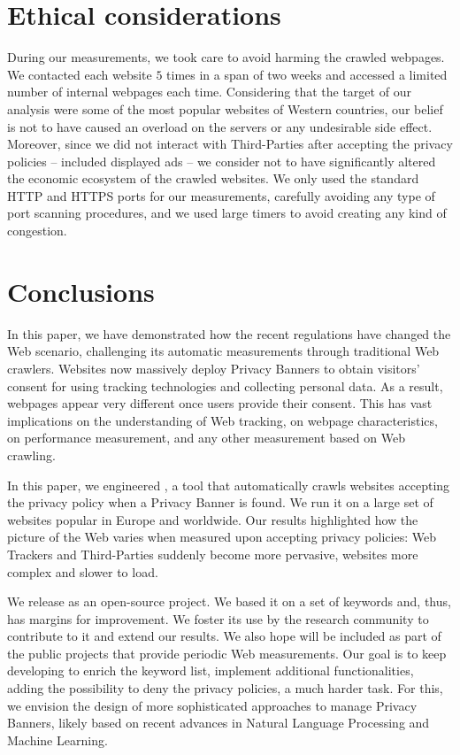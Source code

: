 \section{Ethical considerations}
\label{sec:ethics}

During our measurements, we took care to avoid harming the crawled webpages. We contacted each website $5$ times in a span of two weeks and accessed a limited number of internal webpages each time. Considering that the target of our analysis were some of the most popular websites of Western countries, our belief is not to have caused an overload on the servers or any undesirable side effect. Moreover, since we did not interact with Third-Parties after accepting the privacy policies -- included displayed ads -- we consider not to have significantly altered the economic ecosystem of the crawled websites. We only used the standard HTTP and HTTPS ports for our measurements, carefully avoiding any type of port scanning procedures, and we used large timers to avoid creating any kind of congestion.



\section{Conclusions}
\label{sec:conclu}

In this paper, we have demonstrated how the recent regulations have changed the Web scenario, challenging its automatic measurements through traditional Web crawlers. Websites now massively deploy Privacy Banners to obtain visitors' consent for using tracking technologies and collecting personal data. As a result, webpages appear very different once users provide their consent. This has vast implications on the understanding of Web tracking, on webpage characteristics, on performance measurement, and any other measurement based on Web crawling.

In this paper, we engineered \TOOL, a tool that automatically crawls websites accepting the privacy policy when a Privacy Banner is found. We run it on a large set of websites popular in Europe and worldwide. Our results highlighted how the picture of the Web varies when measured upon accepting privacy policies: Web Trackers and Third-Parties suddenly become more pervasive, websites more complex and slower to load.

We release \TOOL as an open-source project. We based it on a set of keywords and, thus, has margins for improvement. We foster its use by the research community to contribute to it and extend our results. We also hope \TOOL will be included as part of the public projects that provide periodic Web measurements. Our goal is to keep developing \TOOL to enrich the keyword list, implement additional functionalities, adding the possibility to deny the privacy policies, a much harder task. For this, we envision the design of more sophisticated approaches to manage Privacy Banners, likely based on recent advances in Natural Language Processing and Machine Learning.
